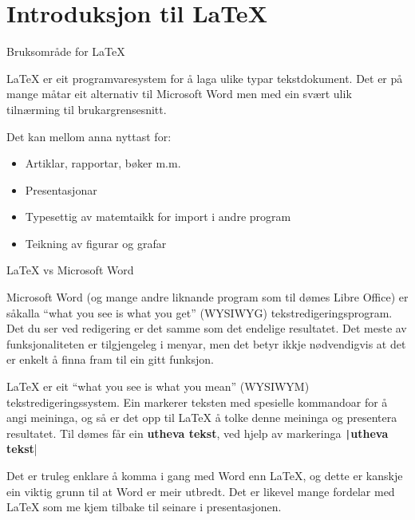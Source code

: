 \section{Introduksjon til \LaTeX}

\begin{frame}{Bruksområde for \LaTeX}
	
	\LaTeX{} er eit programvaresystem for å laga ulike typar tekstdokument. Det er på mange måtar eit alternativ til Microsoft Word men med ein svært ulik tilnærming til brukargrensesnitt.
	
	Det kan mellom anna nyttast for:
	
	\begin{itemize}
		\item Artiklar, rapportar, bøker m.m.
		\item Presentasjonar
		\item Typesettig av matemtaikk for import i andre program
		\item Teikning av figurar og grafar
	\end{itemize}
	
\end{frame}


	\begin{frame}{\LaTeX{} vs Microsoft Word}
	
	Microsoft Word (og mange andre liknande program som til dømes Libre Office) er såkalla ``what you see is what you get'' (WYSIWYG) tekstredigeringsprogram. Det du ser ved redigering er det samme som det endelige resultatet. Det meste av funksjonaliteten er tilgjengeleg i menyar, men det betyr ikkje nødvendigvis at det er enkelt å finna fram til ein gitt funksjon.
	
	\LaTeX{} er eit ``what you see is what you mean'' (WYSIWYM) tekstredigeringssystem. Ein markerer teksten med spesielle kommandoar for å angi meininga, og så er det opp til \LaTeX{} å tolke denne meininga og presentera resultatet. Til dømes får ein \textbf{utheva tekst}, ved hjelp av markeringa \texttt|\textbf{utheva tekst}|
	
	Det er truleg enklare å komma i gang med Word enn \LaTeX{}, og dette er kanskje ein viktig grunn til at Word er meir utbredt. Det er likevel mange fordelar med \LaTeX{} som me kjem tilbake til seinare i presentasjonen.
	
\end{frame}

